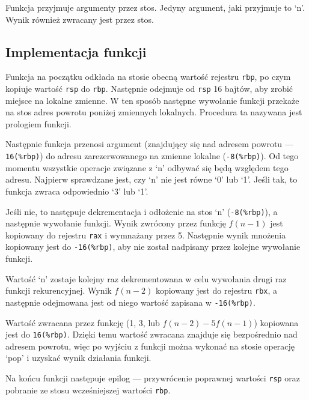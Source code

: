 \documentclass[polish, 11pt]{article}
\begin{document}
		\begin{minipage}{.5\textwidth}
			Funkcja przyjmuje argumenty przez stos.
			Jedyny argument, jaki przyjmuje to `n'.
			Wynik również zwracany jest przez stos.
		\end{minipage}%
		\hspace{1cm}
		\begin{minipage}{.5\textwidth}
			
		\end{minipage}

	\subsection{Implementacja funkcji}

		\begin{minipage}{.5\textwidth}
			Funkcja na początku odkłada na stosie obecną wartość rejestru \texttt{rbp}, po czym kopiuje wartość \texttt{rsp} do \texttt{rbp}.
			Następnie odejmuje od \texttt{rsp} 16 bajtów, aby zrobić miejsce na lokalne zmienne.
			W ten sposób następne wywołanie funkcji przekaże na stos adres powrotu poniżej zmiennych lokalnych.
			Procedura ta nazywana jest prologiem funkcji.

			Następnie funkcja przenosi argument (znajdujący się nad adresem powrotu --- \texttt{16(\%rbp)}) do adresu zarezerwowanego na zmienne lokalne (\texttt{-8(\%rbp)}).
			Od tego momentu wszystkie operacje związane z `n' odbywać się będą względem tego adresu.
			Najpierw sprawdzane jest, czy `n' nie jest równe `0' lub `1'.
			Jeśli tak, to funkcja zwraca odpowiednio `3' lub `1'.

			Jeśli nie, to następuje dekrementacja i odłożenie na stos `n' (\texttt{-8(\%rbp)}), a następnie wywołanie funkcji.
			Wynik zwrócony przez funkcję \(f(n-1)\) jest kopiowany do rejestru \texttt{rax} i wymnażany przez 5.
			Następnie wynik mnożenia kopiowany jest do \texttt{-16(\%rbp)}, aby nie został nadpisany przez kolejne wywołanie funkcji.

			Wartość `n' zostaje kolejny raz dekrementowana w celu wywołania drugi raz funkcji rekurencyjnej.
			Wynik \(f(n-2)\) kopiowany jest do rejestru \texttt{rbx}, a następnie odejmowana jest od niego wartość zapisana w \texttt{-16(\%rbp)}.

			Wartość zwracana przez funkcję (1, 3, lub \(f(n-2)-5f(n-1)\)) kopiowana jest do \texttt{16(\%rbp)}.
			Dzięki temu wartość zwracana znajduje się bezpośrednio nad adresem powrotu, więc po wyjściu z funkcji można wykonać na stosie operację `pop' i uzyskać wynik działania funkcji.

			Na końcu funkcji następuje epilog --- przywrócenie poprawnej wartości \texttt{rsp} oraz pobranie ze stosu wcześniejszej wartości \texttt{rbp}.
			
		\end{minipage}%
		\hspace{1cm}
		\begin{minipage}{.5\textwidth}
			
		\end{minipage}
\end{document}
